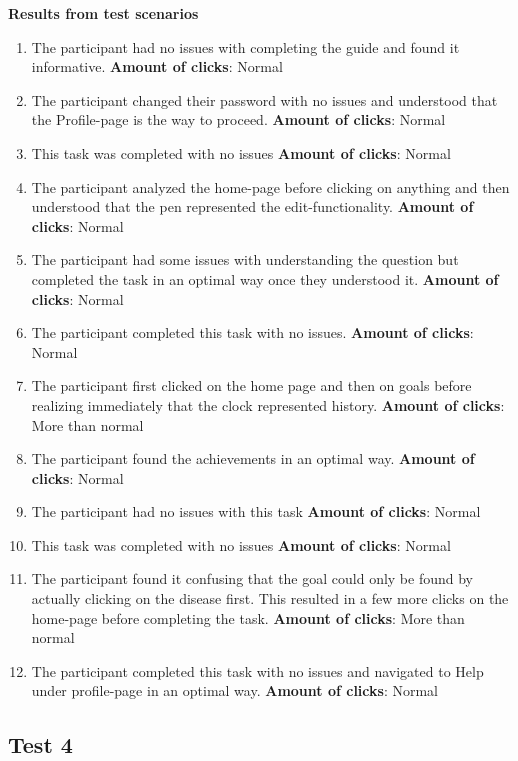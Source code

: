 \noindent\textbf{Results from test scenarios}
\begin{enumerate}
\item The participant had no issues with completing the guide and found it informative. 
\subitem \textbf{Amount of clicks}: Normal
\item The participant changed their password with no issues and understood that the Profile-page is the way to proceed.
\subitem \textbf{Amount of clicks}: Normal
\item This task was completed with no issues
\subitem \textbf{Amount of clicks}: Normal
\item The participant analyzed the home-page before clicking on anything and then understood that the pen represented the edit-functionality.
\subitem \textbf{Amount of clicks}: Normal
\item The participant had some issues with understanding the question but completed the task in an optimal way once they understood it. 
\subitem \textbf{Amount of clicks}: Normal
\item The participant completed this task with no issues. 
\subitem \textbf{Amount of clicks}: Normal
\item The participant first clicked on the home page and then on goals before realizing immediately that the clock represented history. 
\subitem\textbf{Amount of clicks}: More than normal
\item The participant found the achievements in an optimal way. 
\subitem \textbf{Amount of clicks}: Normal
\item The participant had no issues with this task 
\subitem \textbf{Amount of clicks}:  Normal
\item This task was completed with no issues 
\subitem \textbf{Amount of clicks}: Normal
\item The participant found it confusing that the goal could only be found by actually clicking on the disease first. This resulted in a few more clicks on the home-page before completing the task.  
\subitem \textbf{Amount of clicks}: More than normal
\item The participant completed this task with no issues and navigated to Help under profile-page in an optimal way.  
\subitem \textbf{Amount of clicks}: Normal
\end{enumerate}



\subsection{Test 4}

